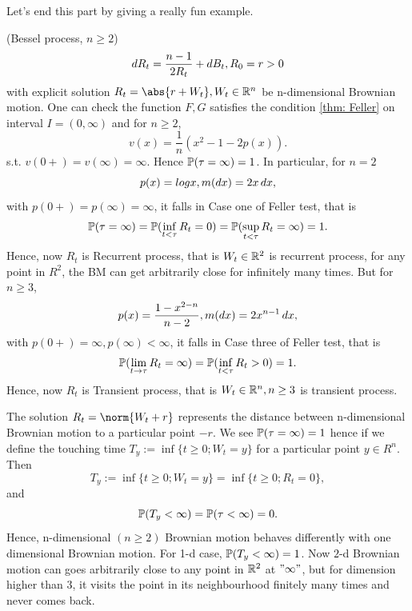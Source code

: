 Let's end this part by giving a really fun example.
\begin{example}{(Bessel process, $n\geq 2$)}
\begin{equation*}
    \mathop{}\!d R_t = \frac{n-1}{2 R_t} + \mathop{}\!d B_t, R_0 = r >0
\end{equation*}
with explicit solution $R_t = \abs{r + W_t} , W_t \in \R^n$ be n-dimensional Brownian motion.  One can check the function $F, G$ satisfies the condition \ref{thm: Feller} on interval $I = (0, \infty)$ and for $n \geq 2$,
\begin{equation*}
    v(x) = \frac{1}{n} (x^2 -1 -2p(x)).
\end{equation*} s.t. $v(0+) = v(\infty) = \infty$. Hence $\mathbb{P}(\tau = \infty) = 1$. In particular, for $n = 2$
\begin{equation*}
    p(x) = log x, m(\mathop{}\!d x) = 2x \mathop{}\!d x,
\end{equation*} with $p(0+) = p(\infty) = \infty$, it falls in Case one of Feller test, that is 
\begin{equation*}
    \mathbb{P}(\tau = \infty) = \mathbb{P}(\inf_{t < \tau} R_t = 0) = \mathbb{P}(\sup_{t < \tau} R_t = \infty) = 1.
\end{equation*}
Hence, now $R_t$ is Recurrent process, that is $W_t \in \mathbb{R}^2$ is recurrent process, for any point in $R^2$, the BM can get arbitrarily close for infinitely many times. But for $n \geq 3$,
\begin{equation*}
    p(x) = \frac{1-x^{2-n}}{n -2}, m(\mathop{}\!d x) = 2x^{n-1} \mathop{}\!d x,
\end{equation*} with $p(0+) = \infty, p(\infty) < \infty$, it falls in Case three of Feller test, that is 
\begin{equation*}
    \mathbb{P}(\lim\limits_{t\rightarrow \tau} R_t = \infty) = \mathbb{P}(\inf_{t < \tau} R_t > 0) = 1.
\end{equation*}
Hence, now $R_t$ is Transient process, that is $W_t \in \mathbb{R}^n, n \geq 3$ is transient process.
\end{example}

The solution $R_t = \norm{W_t + r}$ represents the distance between n-dimensional Brownian motion to a particular point $-r$. We see $\mathbb{P}(\tau = \infty) = 1$ hence if we define the touching time $T_y := \inf\{t\geq 0; W_t = y \}$ for a particular point $y \in R^n$. Then 
\begin{equation*}
    T_y := \inf\{t\geq 0; W_t = y \} = \inf\{t\geq 0; R_t = 0 \},
\end{equation*}
and
\begin{equation*}
    \mathbb{P}(T_y < \infty) = \mathbb{P}(\tau < \infty) =0.
\end{equation*}
Hence, n-dimensional $(n\geq 2)$ Brownian motion behaves differently with one dimensional Brownian motion. For 1-d case, $\mathbb{P}(T_y <\infty) = 1$. Now $2$-d Brownian motion can goes arbitrarily close to any point in $\mathbb{R}^2$ at $"\infty"$, but for dimension higher than $3$, it visits the point in its neighbourhood finitely many times and never comes back. 
\newpage
